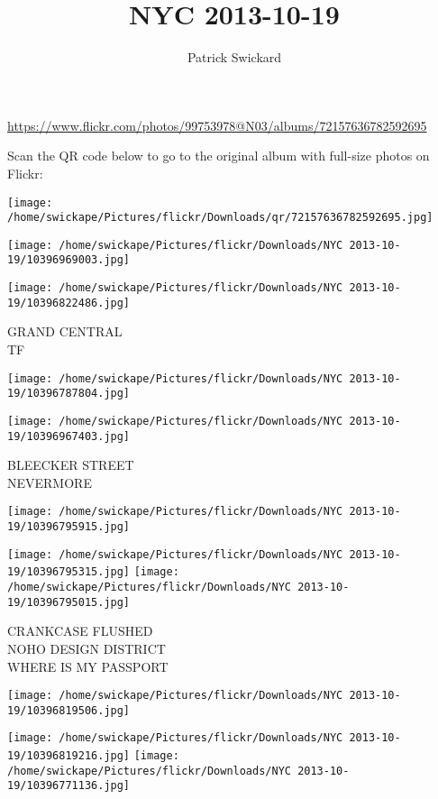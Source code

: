 \documentclass[10pt,letterpaper]{article}
\title{NYC 2013-10-19}
\author{Patrick Swickard}
\date{}
\begin{document}
\maketitle

\url{https://www.flickr.com/photos/99753978@N03/albums/72157636782592695}

Scan the QR code below to go to the original album with full-size photos on Flickr:

\texttt{[image: /home/swickape/Pictures/flickr/Downloads/qr/72157636782592695.jpg]}
\pagebreak

\texttt{[image: /home/swickape/Pictures/flickr/Downloads/NYC 2013-10-19/10396969003.jpg]}

\vspace{0.25in}
\texttt{[image: /home/swickape/Pictures/flickr/Downloads/NYC 2013-10-19/10396822486.jpg]}

GRAND CENTRAL\\
TF
\pagebreak

\texttt{[image: /home/swickape/Pictures/flickr/Downloads/NYC 2013-10-19/10396787804.jpg]}

\vspace{0.25in}
\texttt{[image: /home/swickape/Pictures/flickr/Downloads/NYC 2013-10-19/10396967403.jpg]}

BLEECKER STREET\\
NEVERMORE
\pagebreak

\texttt{[image: /home/swickape/Pictures/flickr/Downloads/NYC 2013-10-19/10396795915.jpg]}

\vspace{0.25in}
\texttt{[image: /home/swickape/Pictures/flickr/Downloads/NYC 2013-10-19/10396795315.jpg]}
\texttt{[image: /home/swickape/Pictures/flickr/Downloads/NYC 2013-10-19/10396795015.jpg]}

CRANKCASE FLUSHED\\
NOHO DESIGN DISTRICT\\
WHERE IS MY PASSPORT
\pagebreak

\texttt{[image: /home/swickape/Pictures/flickr/Downloads/NYC 2013-10-19/10396819506.jpg]}

\vspace{0.25in}
\texttt{[image: /home/swickape/Pictures/flickr/Downloads/NYC 2013-10-19/10396819216.jpg]}
\texttt{[image: /home/swickape/Pictures/flickr/Downloads/NYC 2013-10-19/10396771136.jpg]}
\end{document}
